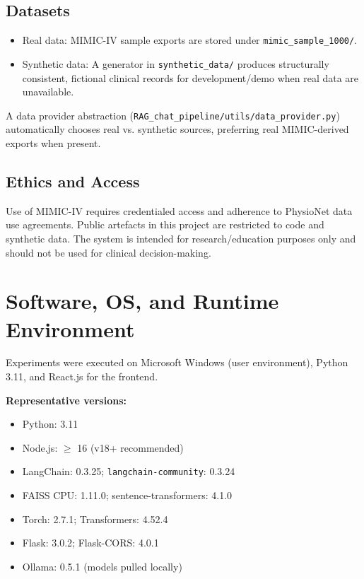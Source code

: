 \subsection{Datasets}
\begin{itemize}
  \item Real data: MIMIC-IV sample exports are stored under \texttt{mimic\_sample\_1000/}.
  \item Synthetic data: A generator in \texttt{synthetic\_data/} produces structurally consistent, fictional clinical records for development/demo when real data are unavailable.
\end{itemize}

\noindent A data provider abstraction (\texttt{RAG\_chat\_pipeline/utils/data\_provider.py}) automatically chooses real vs. synthetic sources, preferring real MIMIC-derived exports when present.

\subsection{Ethics and Access}
Use of MIMIC-IV requires credentialed access and adherence to PhysioNet data use agreements. Public artefacts in this project are restricted to code and synthetic data. The system is intended for research/education purposes only and should not be used for clinical decision-making.

\section{Software, OS, and Runtime Environment}
Experiments were executed on Microsoft Windows (user environment), Python 3.11, and React.js for the frontend.

\smallskip
\noindent\textbf{Representative versions:}
\begin{itemize}
  \item Python: 3.11
  \item Node.js: \(\ge\) 16 (v18+ recommended)
  \item LangChain: 0.3.25; \texttt{langchain-community}: 0.3.24
  \item FAISS CPU: 1.11.0; sentence-transformers: 4.1.0
  \item Torch: 2.7.1; Transformers: 4.52.4
  \item Flask: 3.0.2; Flask-CORS: 4.0.1
  \item Ollama: 0.5.1 (models pulled locally)
\end{itemize}

